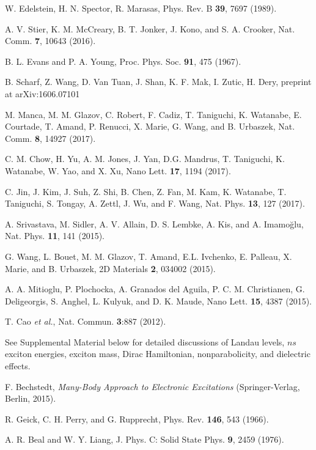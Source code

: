 \documentclass[aps,prl,twocolumn]{revtex4-1}
\begin{document}
\begin{references}
W. Edelstein, H. N. Spector, R. Marasas, Phys. Rev. B \textbf{39}, 7697 (1989).

 A. V. Stier, K. M. McCreary, B. T. Jonker, J. Kono, and S. A. Crooker, Nat. Comm. \textbf{7}, 10643 (2016).

B. L. Evans and P. A. Young, Proc. Phys. Soc. \textbf{91}, 475 (1967).

B. Scharf, Z. Wang, D. Van Tuan, J. Shan, K. F. Mak, I. Zutic, H. Dery, preprint at arXiv:1606.07101

 M. Manca, M. M. Glazov, C. Robert, F. Cadiz, T. Taniguchi, K. Watanabe, E. Courtade, T. Amand, P. Renucci, X. Marie, G. Wang, and B. Urbaszek, Nat. Comm. \textbf{8}, 14927 (2017). %

 C. M. Chow, H. Yu, A. M. Jones, J. Yan, D.G. Mandrus, T. Taniguchi, K. Watanabe, W. Yao, and X. Xu, Nano Lett. \textbf{17}, 1194 (2017).

 C. Jin, J. Kim, J. Suh, Z. Shi, B. Chen, Z. Fan, M. Kam, K. Watanabe, T. Taniguchi, S. Tongay, A. Zettl, J. Wu, and F. Wang, Nat. Phys. \textbf{13}, 127 (2017).

 A. Srivastava, M. Sidler, A. V. Allain, D. S. Lembke, A. Kis, and A. Imamo\u{g}lu, Nat. Phys. \textbf{11}, 141 (2015).

 G. Wang, L. Bouet, M. M. Glazov, T. Amand, E.L. Ivchenko, E. Palleau, X. Marie, and B. Urbaszek, 2D Materials \textbf{2}, 034002 (2015).

 A. A. Mitioglu, P. Plochocka, A. Granados del Aguila, P. C. M. Christianen, G. Deligeorgis, S. Anghel, L. Kulyuk, and D. K. Maude, Nano Lett. \textbf{15}, 4387 (2015). %

T. Cao \textit{et al.}, Nat. Commun. \textbf{3}:887 (2012). %

See Supplemental Material below for detailed discussions of Landau levels, $ns$ exciton energies, exciton mass, Dirac Hamiltonian, nonparabolicity, and dielectric effects.
   
F. Bechstedt, \textit{Many-Body Approach to Electronic Excitations} (Springer-Verlag, Berlin, 2015).

R. Geick, C. H. Perry, and G. Rupprecht, Phys. Rev. \textbf{146}, 543 (1966). %

A. R. Beal and W. Y. Liang, J. Phys. C: Solid State Phys. \textbf{9}, 2459 (1976). %

\end{references}
\end{document}
